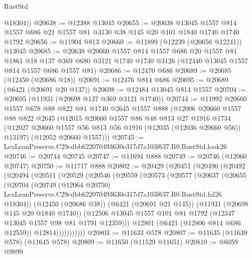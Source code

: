 \begin{lexlean}{RustStd}
\begin{coremodule}
        @18304))
@20638 := @12388 @13045
@20655 := @20638
    @13045
    @1557
    @814
    @1557
    @686
    @21
    @1557
    @81
    @3130
    @38
    @145
    @20
    @101
    @1840
    @1740
    @1740
    @1792
@20656 := @11904 @813
@20660 := @11899 (@12239 (@20656 @12241)) @13045
@20685 := @20638
    @20660
    @1557
    @814
    @1557
    @686
    @20
    @1557
    @81
    @1861
    @18
    @137
    @369
    @680
    @3121
    @1740
    @1740
    @3126
    (@12440 @13045 @1557 @814 @1557 @686 @1557 @81)
@20686 := @12470 @686
@20689 := @20685 (@12450 (@20686 @18))
@20691 := @12476 @814 @686
@20695 := @20689 (@6421 (@20691 @20 @137))
@20698 := @12484 @13045 @814 @1557
@20704 := @20695 (@11931 (@20698 @137 @369 @3121 @1740))
@20744 := @11992
    @20660
    @1557
    @678
    @88
    @822
    @81
    @1740
    @2645
    @1557
    @888
    (@12006
      @20660
      @1557
      @88
      @822
      @2645
      (@12015
        @20660
        @1557
        @86
        @48
        @813
        @27
        @1916
        @1734
        (@12027 @20660 @1557 @56 @813 @56 @1916 (@12035 (@12036 @20660 @56)) @13197)
        (@12052 @20660 @1557)))
@20745 := LexLeanPreserve.C29cdbb622070493630e317d7a103f637.R0.RustStd.look26
@20746 := @20744 @20745
@20747 := @11694 @888
@20749 := @20746 (@12060 @20747)
@20750 := @11717 @888
@20802 := @20429
    (@20451
      (@20490
        (@20492
          (@20494
            (@20511
              (@20529
                (@20546
                  (@20559
                    (@20573
                      (@20577
                        (@20637
                          (@20655
                            (@20704
                              (@20749
                                (@12064 @20750)
                                LexLeanPreserve.C29cdbb622070493630e317d7a103f637.R0.RustStd.fal26
                                @18304))
                            (@12450 (@20686 @38))
                            (@6421 (@20691 @21 @145))
                            (@11931 (@20698 @145 @20 @1840 @1740))
                            (@12506
                              @13045
                              @1557
                              @101
                              @81
                              @1792
                              (@12347 @13045 @1557 @98 @81 @1791 @12359)))
                          @12801
                          (@6421 (@12806 @814 @686 @12559))
                          @12814)))))))))))
@20803 := @11633 @578
@20807 := @11635 (@11639 @578) (@11645 @578)
@20809 := @11650 (@11529 @11651)
@20810 := @6059 @9899

\end{coremodule}
\end{lexlean}
